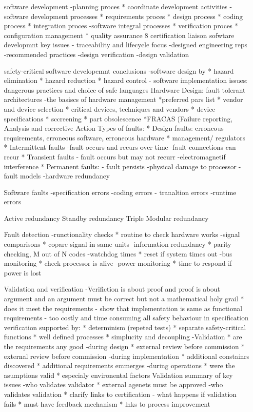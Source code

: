 software development
-planning proces
* coordinate development activities
-software development processes
* requirements proces
* design process
* coding process
* integration proces
-software integral	 processes
* verification proces
* configuration management
* quality assurance
8 certification liaison
sofwtare developmnt key issues
- traceability and lifecycle focus
-designed engineering reps
-recommended practices
-design verification
-design validation

safety-critical software developemnt conclusions
-software design by
* hazard elimination
* hazard reduction
* hazard control
- software implementation issues: dangerous practices and choice of safe languages
Hardware Design: fault tolerant architectures
-the basiscs of hardware  management
*preferred pars list
* vendor and device selection
* critical devices, techniques and vendors
* device specifications
* sccreening
* part obsolescence
*FRACAS (Failure reporting, Analysis and corrective Action
Types of faults:
* Design faults: erroneous requirements, erroneous software, erroneous hardware
* management/ regulators
* Intermittent faults
-fault occurs and recurs over time
-fault connections can recur
* Transient faults
- fault occurs but may not recurr
-electromagnetif interference
* Permanent faults:
- fault persists
-physical damage to processor
- fault models
-hardware redundancy

Software faults
-specification errors
-coding errors
- tranaltion errors
-runtime errors

Active redundancy
Standby redundancy
Triple Modular redundancy

Fault detection
-runctionality checks
* routine to check hardware works
-signal comparisons
* copare signal in same units
-information redundancy
* parity checking, M out of N codes
-watchdog times
* reset if system times out
-bus monitoring
* check processor is alive
-power monitoring
* time to respond if power is lost


Validation and verification
-Verifiction is about proof and proof is about argument and an argument must be correct but not a mathematical holy grail
* does it meet the requirements
- show that  implementation is same as functional requirements
- too costly and time consuming all safety behaviour in specification
verification supported by:
* determinism (repeted tests)
* separate safety-critical functions
* well defined processes
* simplucity and decoupling
-Validation
* are the requirements any good
-during design
* external review before commission
* external review before commission
-during implementation
* additional constainrs discovered
* additional requirements emmerges
-during operations
* were the asumptions valid
* especialy environental factors
Validation summary of key issues
-who validates validator
* external agenets must be approved
-who validates validation
* clarify links to certification
- what happens if  validation fails
* must have feedback mechanism
* lnks to process improvement



